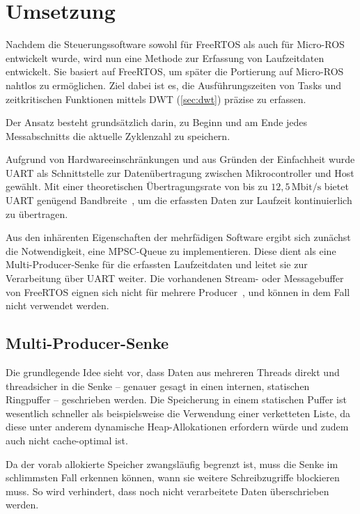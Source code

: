 \section{Umsetzung}

Nachdem die Steuerungssoftware sowohl für FreeRTOS als auch für Micro-ROS
entwickelt wurde, wird nun eine Methode zur Erfassung von Laufzeitdaten
entwickelt. Sie basiert auf FreeRTOS, um später die Portierung auf Micro-ROS
nahtlos zu ermöglichen. Ziel dabei ist es, die Ausführungszeiten von Tasks und
zeitkritischen Funktionen mittels DWT (\ref{sec:dwt}) präzise zu erfassen.

Der Ansatz besteht grundsätzlich darin, zu Beginn und am Ende jedes
Messabschnitts die aktuelle Zyklenzahl zu speichern.

Aufgrund von Hardwareeinschränkungen und aus Gründen der Einfachheit wurde UART
als Schnittstelle zur Datenübertragung zwischen Mikrocontroller und Host
gewählt. Mit einer theoretischen Übertragungsrate von bis zu
$12,5\,\text{Mbit/s}$ bietet UART genügend Bandbreite~\cite[S.
2]{stm32_datasheet}, um die erfassten Daten zur Laufzeit kontinuierlich zu
übertragen.

Aus den inhärenten Eigenschaften der mehrfädigen Software ergibt sich zunächst
die Notwendigkeit, eine \ac{MPSC}-Queue zu implementieren. Diese dient als eine
Multi-Producer-Senke für die erfassten Laufzeitdaten und leitet sie zur
Verarbeitung über UART weiter. Die vorhandenen Stream- oder Messagebuffer von
FreeRTOS eignen sich nicht für mehrere Producer~\cite{FreeRTOSStreamBuffer}, und
können in dem Fall nicht verwendet werden.

\subsection{Multi-Producer-Senke}

Die grundlegende Idee sieht vor, dass Daten aus mehreren Threads direkt und
threadsicher in die Senke -- genauer gesagt in einen internen, statischen
Ringpuffer -- geschrieben werden. Die Speicherung in einem statischen Puffer ist
wesentlich schneller als beispielsweise die Verwendung einer verketteten Liste,
da diese unter anderem dynamische Heap-Allokationen erfordern würde und zudem
auch nicht cache-optimal ist.

Da der vorab allokierte Speicher zwangsläufig begrenzt ist, muss die Senke im
schlimmsten Fall erkennen können, wann sie weitere Schreibzugriffe blockieren
muss. So wird verhindert, dass noch nicht verarbeitete Daten überschrieben
werden.

